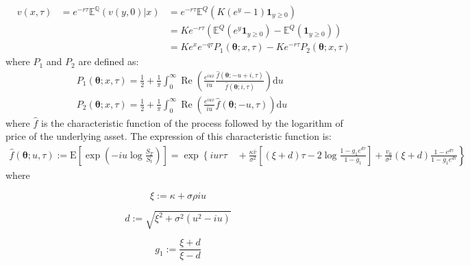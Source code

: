 \documentclass[12,twoside]{mammeTFM}
\theoremstyle{definition}
\theoremstyle{remark}
\newcommand{\E}{\ensuremath{\mathbb{E}}}
\newcommand{\Q}{\ensuremath{\mathbb{Q}}}
\begin{document}
\begin{align} 
\label{eq:option_valuation_expectation}
& v(x, \tau) & = e^{-r \tau}\E^{\Q}(v(y, 0)|x) & = e^{-r \tau} \E^{Q}(K(e^y - 1)\boldsymbol{1}_{y \geq 0}) \\  
\label{eq:option_valuation_useless}
&  &  & = Ke^{-r \tau}(\E^{Q}(e^y \boldsymbol{1}_{y \geq 0}) - \E^{Q}(\boldsymbol{1}_{y \geq 0})) \\
\label{eq:option_valuation_final_form}
&  &  & = K e^x e^{-q \tau} P_1(\boldsymbol{\theta}; x, \tau) - K e^{-r \tau} P_2(\boldsymbol{\theta}; x, \tau)
\end{align}
where $P_1$ and $P_2$ are defined as:
\begin{align}
&P_{1}(\boldsymbol{\theta} ; x, \tau)=\frac{1}{2}+\frac{1}{\pi} \int_{0}^{\infty} \operatorname{Re}\left(\frac{e^{i u x}}{i u} \frac{\hat{f}(\boldsymbol{\theta} ; -u+i, \tau)}{\hat{f}(\boldsymbol{\theta} ;i, \tau)}\right) \mathrm{d} u\\
&P_{2}(\boldsymbol{\theta} ; x, \tau)=\frac{1}{2}+\frac{1}{\pi} \int_{0}^{\infty} \operatorname{Re}\left(\frac{e^{iux}}{i u} \hat{f}(\boldsymbol{\theta} ; -u, \tau)\right) \mathrm{d} u
\end{align}
where $\hat{f}$ is the characteristic function of the process followed by the logarithm of price of the underlying asset. The expression of this characteristic function is:
\begin{equation} \label{eq:char_heston}
\begin{aligned}
\hat{f}(\boldsymbol{\theta} ; u, \tau):=\mathrm{E}\left[\exp \left(-i u \log \frac{S_{T}}{S_{t}}\right)\right]=\exp \left\{i u r \tau\right.
\left.\quad+\frac{\kappa \bar{v}}{\sigma^{2}}\left[(\xi+d) \tau-2 \log \frac{1-g_{1} e^{d \tau}}{1-g_{1}}\right]+\frac{v_{0}}{\sigma^{2}}(\xi+d) \frac{1-e^{d \tau}}{1-g_{1} e^{d \tau}}\right\}
\end{aligned}
\end{equation}
where

\noindent\begin{minipage}{.3\linewidth}
\begin{equation}
\xi:=\kappa + \sigma \rho i u
\end{equation}
\end{minipage}
\noindent\begin{minipage}{.4\linewidth}
\begin{equation} \label{eq:char_d}
d:=\sqrt{\xi^{2}+\sigma^{2}\left(u^{2} - i u\right)}
\end{equation}
\end{minipage}
\noindent\begin{minipage}{.3\linewidth}
\begin{equation}
g_{1}:=\frac{\xi+d}{\xi-d}
\end{equation}
\end{minipage}
\end{document}
